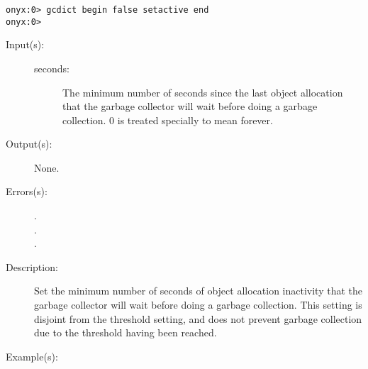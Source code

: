 \begin{description}
\begin{description}
\begin{verbatim}
onyx:0> gcdict begin false setactive end
onyx:0>
		\end{verbatim}
	\end{description}
\label{gcdict:setperiod}
\item[{\onyxop{seconds}{setperiod}{--}}: ]
	\begin{description}\item[]
	\item[Input(s): ]
		\begin{description}\item[]
		\item[seconds: ]
			The minimum number of seconds since the last object
			allocation that the garbage collector will wait before
			doing a garbage collection.  0 is treated specially to
			mean forever.
		\end{description}
	\item[Output(s): ] None.
	\item[Errors(s): ]
		\begin{description}\item[]
		\item[.]
		\item[.]
		\item[.]
		\end{description}
	\item[Description: ]
		Set the minimum number of seconds of object allocation
		inactivity that the garbage collector will wait before doing a
		garbage collection.  This setting is disjoint from the threshold
		setting, and does not prevent garbage collection due to the
		threshold having been reached.
	\item[Example(s): ]\begin{verbatim}


\end{verbatim}
\end{description}
\end{description}
